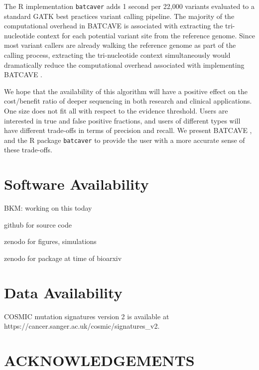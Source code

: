 \documentclass[a4,center,fleqn]{NAR}
\newcommand{\bkmcomment}[1]{{\color{blue}BKM: #1}}
\newcommand{\batcave}{BATCAVE }
\begin{document}
The R implementation \texttt{batcaver} adds 1 second per 22,000 variants evaluated to a standard GATK best practices variant calling pipeline. 
The majority of the computational overhead in \batcave is associated with extracting the tri-nucleotide context for each potential variant site from the reference genome.
Since most variant callers are already walking the reference genome as part of the calling process, extracting the tri-nucleotide context simultaneously would dramatically reduce the computational overhead associated with implementing \batcave.

We hope that the availability of this algorithm will have a positive effect on the cost/benefit ratio of deeper sequencing in both research and clinical applications.
One size does not fit all with respect to the evidence threshold. 
Users are interested in true and false positive fractions, and users of different types will have different trade-offs in terms of precision and recall.
We present \batcave, and the R package \texttt{batcaver} to provide the user with a more accurate sense of these trade-offs.


\section{Software Availability}
\bkmcomment{working on this today}

github for source code

zenodo for figures, simulations

zenodo for package at time of bioarxiv

\section{Data Availability}
COSMIC mutation signatures version 2 is available at \footnotesize{https://cancer.sanger.ac.uk/cosmic/signatures\_v2}.



\section{ACKNOWLEDGEMENTS}
\end{document}
